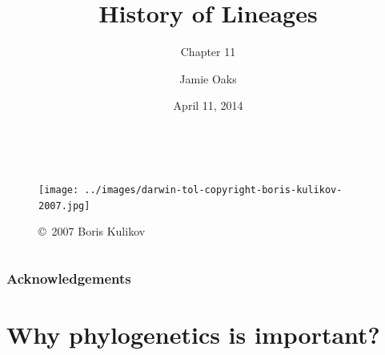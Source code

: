 



\title[History of Lineages]{History of Lineages}
\subtitle{Chapter 11}

\author[J.\ Oaks]{
    Jamie Oaks
}

\date{April 11, 2014}



\begin{frame}
    \begin{columns}[c]
            \maketitle
            \begin{figure}
                \begin{center}
                \texttt{[image: ../images/darwin-tol-copyright-boris-kulikov-2007.jpg]}
                \caption{\tiny \copyright~2007 Boris Kulikov}
                \end{center}
            \end{figure}
    \end{columns}
\end{frame}

\begin{frame}
    \frametitle{Acknowledgements}
\end{frame}

\section{Why phylogenetics is important?}

